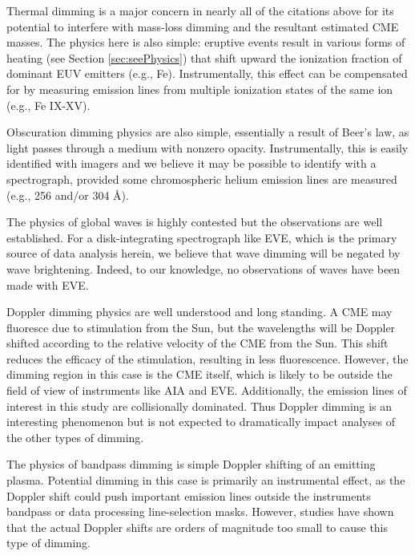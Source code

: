 Thermal dimming is a major concern in nearly all of the citations above for its potential to interfere with mass-loss dimming and the resultant estimated CME masses. The physics here is also simple: eruptive events result in various forms of heating (see Section \ref{sec:seePhysics}) that shift upward the ionization fraction of dominant EUV emitters (e.g., Fe). Instrumentally, this effect can be compensated for by measuring emission lines from multiple ionization states of the same ion (e.g., Fe IX-XV).

Obscuration dimming physics are also simple, essentially a result of Beer's law, as light passes through a medium with nonzero opacity. Instrumentally, this is easily identified with imagers and we believe it may be possible to identify with a spectrograph, provided some chromospheric helium emission lines are measured (e.g., 256 and/or 304 Å). 

The physics of global waves is highly contested but the observations are well established. For a disk-integrating spectrograph like EVE, which is the primary source of data analysis herein, we believe that wave dimming will be negated by wave brightening. Indeed, to our knowledge, no observations of waves have been made with EVE. 

Doppler dimming physics are well understood and long standing. A CME may fluoresce due to stimulation from the Sun, but the wavelengths will be Doppler shifted according to the relative velocity of the CME from the Sun. This shift reduces the efficacy of the stimulation, resulting in less fluorescence. However, the dimming region in this case is the CME itself, which is likely to be outside the field of view of instruments like AIA and EVE. Additionally, the emission lines of interest in this study are collisionally dominated. Thus Doppler dimming is an interesting phenomenon but is not expected to dramatically impact analyses of the other types of dimming. 

The physics of bandpass dimming is simple Doppler shifting of an emitting plasma. Potential dimming in this case is primarily an instrumental effect, as the Doppler shift could push important emission lines outside the instruments bandpass or data processing line-selection masks. However, studies have shown that the actual Doppler shifts are orders of magnitude too small to cause this type of dimming. 

